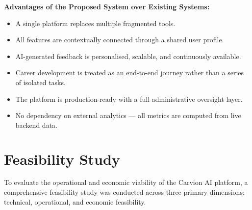 \documentclass[12pt]{article}
\begin{document}
\textbf{Advantages of the Proposed System over Existing Systems:}

\begin{itemize}
  \item A single platform replaces multiple fragmented tools.
  \item All features are contextually connected through a shared user profile.
  \item AI-generated feedback is personalised, scalable, and continuously available.
  \item Career development is treated as an end-to-end journey rather than a series of isolated tasks.
  \item The platform is production-ready with a full administrative oversight layer.
  \item No dependency on external analytics ---  all metrics are computed from live backend data.
\end{itemize}

\clearpage
\section{Feasibility Study}

To evaluate the operational and economic viability of the Carvion AI platform, a comprehensive feasibility study was conducted across three primary dimensions: technical, operational, and economic feasibility.
\end{document}
